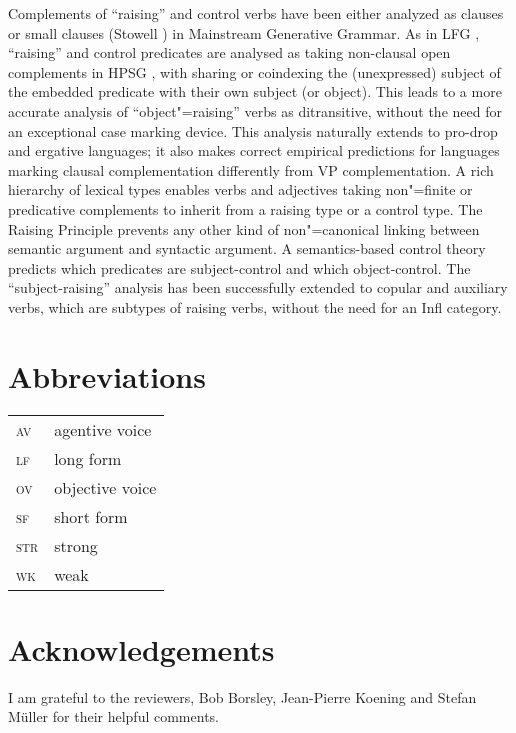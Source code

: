 Complements of ``raising'' and control verbs have been either analyzed as clauses \citep{Chomsky81a}\addpages
or small clauses (Stowell \citeyear{Stowell81a-u,Stowell1983}\addpages) in Mainstream Generative Grammar.  As in LFG
\citep{Bresnan1982}, ``raising'' and control predicates are analysed as taking non-clausal open
complements in HPSG \citep[Chapter~3]{PollardandSag1994}, with sharing or coindexing the (unexpressed) subject
of the embedded predicate with their own subject (or object). This leads to a more accurate analysis
of ``object"=raising'' verbs as ditransitive, without the need for an exceptional case marking
device. This analysis naturally extends to pro-drop and ergative languages; it also makes correct
empirical predictions for languages marking clausal complementation differently from VP
complementation. A rich hierarchy of lexical types enables verbs and adjectives taking non"=finite
or predicative complements to inherit from a raising type or a control type. The Raising Principle
prevents any other kind of non"=canonical linking between semantic argument and syntactic
argument. A semantics-based control theory predicts which predicates are subject-control and which
object-control. The ``subject-raising'' analysis has been successfully extended to copular and
auxiliary verbs, which are subtypes of raising verbs, without the need for an Infl category.



\section*{Abbreviations}

\begin{tabularx}{.45\textwidth}{@{}lX}
\textsc{av} & agentive voice\\
\textsc{lf} & long form\\ 
\textsc{ov} & objective voice\\
\textsc{sf} & short form\\
\textsc{str} & strong\\
\textsc{wk} & weak\\

\end{tabularx}

\section*{Acknowledgements}

I am grateful to the reviewers, Bob Borsley, Jean-Pierre Koening and Stefan Müller for their helpful comments.
{\sloppy
\printbibliography[heading=subbibliography,notkeyword=this] 
}




